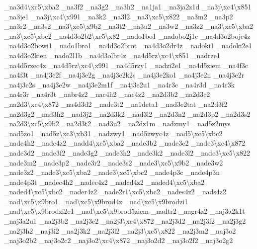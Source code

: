{\-\_\-na3d4\textbackslash{}xc5\textbackslash{}xba2 \-\_\-na3f2 \-\_\-na3g2 \-\_\-na3h2 \-\_\-na1ja1 \-\_\-na3ja2z1d \-\_\-na3j\textbackslash{}xc4\textbackslash{}x851 \-\_\-na3je1 \-\_\-na3j\textbackslash{}xc4\textbackslash{}x991 \-\_\-na3k2 \-\_\-na3l2 \-\_\-na3\textbackslash{}xc5\textbackslash{}x822 \-\_\-na3m2 \-\_\-na3p2 \-\_\-na3r2 \-\_\-na3s2 \-\_\-na3\textbackslash{}xc5\textbackslash{}x9b2 \-\_\-na3t2 \-\_\-na3u2 \-\_\-na3w2 \-\_\-na3z2 \-\_\-na3\textbackslash{}xc5\textbackslash{}xba2 \-\_\-na3\textbackslash{}xc5\textbackslash{}xbc2 \-\_\-na4d3o2b2\textbackslash{}xc5\textbackslash{}x82 \-\_\-nado1bo1 \-\_\-nadobo2j1c \-\_\-na4d3o2bojc4z \-\_\-na4d3o2bowi1 \-\_\-nado1bro1 \-\_\-na4d3o2brot \-\_\-na4d3o2dr4z \-\_\-nadoki1 \-\_\-nadoki2e1 \-\_\-na4d3o2kien \-\_\-nado2l1b \-\_\-na4d3olbr4z \-\_\-na4d5rz\textbackslash{}xc4\textbackslash{}x851 \-\_\-nadrze1 \-\_\-na4d5rzec4z \-\_\-na4d5rz\textbackslash{}xc4\textbackslash{}x991 \-\_\-na4d5rzy1 \-\_\-nadzi2e1 \-\_\-na4d5ziem \-\_\-na4f3c \-\_\-na4f3t \-\_\-na4j3e2f \-\_\-na4j3e2g \-\_\-na4j3e2k2s \-\_\-na4j3e2ko1 \-\_\-na4j3e2n \-\_\-na4j3e2r \-\_\-na4j3e2s \-\_\-na4j3e2w \-\_\-na4j3e2m1f \-\_\-na4j3e2u1 \-\_\-na4r3c \-\_\-na4r3d \-\_\-na4r3k \-\_\-na4r3r \-\_\-na4r3t \-\_\-nabr4z2 \-\_\-nac4h2 \-\_\-nac4z2 \-\_\-na2d3b2 \-\_\-na2d3c2 \-\_\-na2d3\textbackslash{}xc4\textbackslash{}x872 \-\_\-na4d3d2 \-\_\-nade3t2 \-\_\-na1deta1 \-\_\-nad3e2tat \-\_\-na2d3f2 \-\_\-na2d3g2 \-\_\-nad3h2 \-\_\-nad3j2 \-\_\-na2d3k2 \-\_\-nad3l2 \-\_\-na2d3n2 \-\_\-na2d3p2 \-\_\-na2d3s2 \-\_\-na2d3\textbackslash{}xc5\textbackslash{}x9b2 \-\_\-na2d3t2 \-\_\-nad3u2 \-\_\-na2dz1m \-\_\-nadzmy1 \-\_\-nad5z2mys \-\_\-nad5zo1 \-\_\-nad5z\textbackslash{}xc3\textbackslash{}xb31 \-\_\-nadzwy1 \-\_\-nad5zwyc4z \-\_\-nad5\textbackslash{}xc5\textbackslash{}xbc2 \-\_\-nadc4h2 \-\_\-nadc4z2 \-\_\-nadd4\textbackslash{}xc5\textbackslash{}xba2 \-\_\-nade3b2 \-\_\-nade3c2 \-\_\-nade3\textbackslash{}xc4\textbackslash{}x872 \-\_\-nade3d2 \-\_\-nade3f2 \-\_\-nade3g2 \-\_\-nade3h2 \-\_\-nade3k2 \-\_\-nade3l2 \-\_\-nade3\textbackslash{}xc5\textbackslash{}x822 \-\_\-nade3m2 \-\_\-nade3p2 \-\_\-nade3r2 \-\_\-nade3s2 \-\_\-nade3\textbackslash{}xc5\textbackslash{}x9b2 \-\_\-nade3w2 \-\_\-nade3z2 \-\_\-nade3\textbackslash{}xc5\textbackslash{}xba2 \-\_\-nade3\textbackslash{}xc5\textbackslash{}xbc2 \-\_\-nade4p3c \-\_\-nade4p3n \-\_\-nade4p3t \-\_\-nadec4h2 \-\_\-nadec4z2 \-\_\-naded4z2 \-\_\-naded4\textbackslash{}xc5\textbackslash{}xba2 \-\_\-naded4\textbackslash{}xc5\textbackslash{}xbc2 \-\_\-nader4z2 \-\_\-nade2r1\textbackslash{}xc5\textbackslash{}xbc2 \-\_\-nades4z2 \-\_\-nads4z2 \-\_\-nad\textbackslash{}xc5\textbackslash{}x9bro1 \-\_\-nad\textbackslash{}xc5\textbackslash{}x9brod4z \-\_\-nad\textbackslash{}xc5\textbackslash{}x9brodzi1 \-\_\-nad\textbackslash{}xc5\textbackslash{}x9brodzi2e1 \-\_\-nad\textbackslash{}xc5\textbackslash{}x9brod5ziem \-\_\-nadtr2 \-\_\-nagr4z2 \-\_\-naj3a2k1t \-\_\-naj3a2u1 \-\_\-na2j3b2 \-\_\-na2j3c2 \-\_\-na2j3\textbackslash{}xc4\textbackslash{}x872 \-\_\-na2j3d2 \-\_\-na2j3f2 \-\_\-na2j3g2 \-\_\-na2j3h2 \-\_\-naj3i2 \-\_\-na2j3k2 \-\_\-na2j3l2 \-\_\-na2j3\textbackslash{}xc5\textbackslash{}x822 \-\_\-na2j3m2 \-\_\-naj3o2 \-\_\-naj3o2b2 \-\_\-naj3o2c2 \-\_\-naj3o2\textbackslash{}xc4\textbackslash{}x872 \-\_\-naj3o2d2 \-\_\-naj3o2f2 \-\_\-naj3o2g2 }
